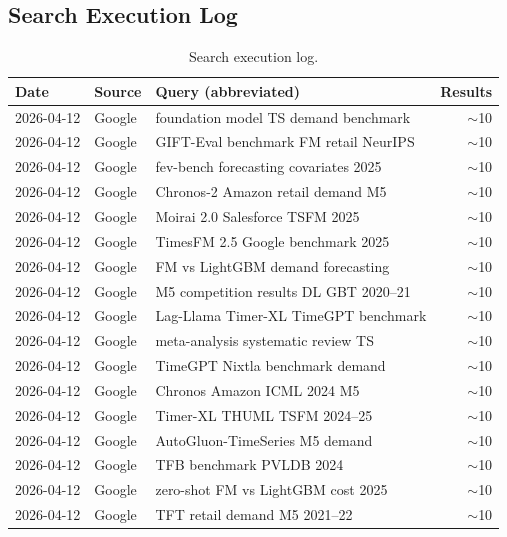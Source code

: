 \subsection{Search Execution Log}

\begin{table}[htbp]
\centering
\caption{Search execution log.}\label{tab:search-log}
\scriptsize
\begin{tabular}{llp{6.5cm}r}
\toprule
Date & Source & Query (abbreviated) & Results \\
\midrule
2026-04-12 & Google      & foundation model TS demand benchmark        & $\sim$10 \\
2026-04-12 & Google      & GIFT-Eval benchmark FM retail NeurIPS       & $\sim$10 \\
2026-04-12 & Google      & fev-bench forecasting covariates 2025       & $\sim$10 \\
2026-04-12 & Google      & Chronos-2 Amazon retail demand M5           & $\sim$10 \\
2026-04-12 & Google      & Moirai 2.0 Salesforce TSFM 2025            & $\sim$10 \\
2026-04-12 & Google      & TimesFM 2.5 Google benchmark 2025           & $\sim$10 \\
2026-04-12 & Google      & FM vs LightGBM demand forecasting           & $\sim$10 \\
2026-04-12 & Google      & M5 competition results DL GBT 2020--21      & $\sim$10 \\
2026-04-12 & Google      & Lag-Llama Timer-XL TimeGPT benchmark        & $\sim$10 \\
2026-04-12 & Google      & meta-analysis systematic review TS          & $\sim$10 \\
2026-04-12 & Google      & TimeGPT Nixtla benchmark demand             & $\sim$10 \\
2026-04-12 & Google      & Chronos Amazon ICML 2024 M5                 & $\sim$10 \\
2026-04-12 & Google      & Timer-XL THUML TSFM 2024--25                & $\sim$10 \\
2026-04-12 & Google      & AutoGluon-TimeSeries M5 demand              & $\sim$10 \\
2026-04-12 & Google      & TFB benchmark PVLDB 2024                    & $\sim$10 \\
2026-04-12 & Google      & zero-shot FM vs LightGBM cost 2025          & $\sim$10 \\
2026-04-12 & Google      & TFT retail demand M5 2021--22               & $\sim$10 \\

\end{tabular}
\end{table}
